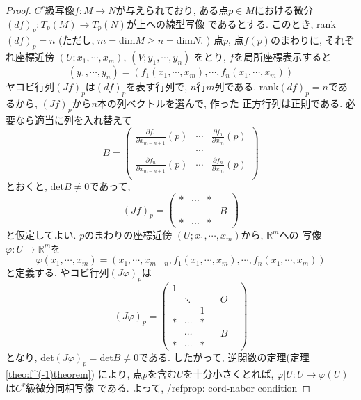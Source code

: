 \documentclass[a4j,12pt]{jarticle}
\theoremstyle{definition}
\begin{document}
\begin{proof}
    $C^r$級写像$f:M\to N$が与えられており, 
    ある点$p\in M$における微分
    $(df)_p:T_p(M)\to T_p(N)$が上への線型写像
    であるとする. このとき, rank$(df)_p=n$
    (ただし, $m=$dim$M\geq n=$dim$N$. )
    点$p$, 点$f(p)$のまわりに, それぞれ座標近傍
    $(U;x_1,\cdots ,x_m)$, $(V;y_1,\cdots ,y_n)$
    をとり, $f$を局所座標表示すると
    $$(y_1, \cdots ,y_n)=(f_1(x_1,\cdots ,x_m), 
    \cdots ,f_n(x_1,\cdots ,x_m))$$
    ヤコビ行列$(Jf)_p$は$(df)_p$を表す行列で, 
    $n$行$m$列である. rank$(df)_p=n$であるから, 
    $(Jf)_p$から$n$本の列ベクトルを選んで, 作った
    正方行列は正則である. 必要なら適当に列を入れ替えて
    $$B=
    \begin{pmatrix}
        \frac{\partial f_1}{\partial x_{m-n+1}}(p) & \cdots & \frac{\partial f_1}{\partial x_m}(p)  \\
        &\cdots& \\
        \frac{\partial f_n}{\partial x_{m-n+1}}(p) & \cdots & \frac{\partial f_n}{\partial x_m}(p)  \\
    \end{pmatrix}
    $$
    とおくと, det$B \neq 0$であって, 
    $$(Jf)_p=
    \left(
        \begin{array}{ccc|c} 
          * & \cdots & *  &  \\
           &  &   & B \\
          * & \cdots & *  & 
        \end{array} 
        \right)
$$
と仮定してよい. $p$のまわりの座標近傍
$(U;x_1,\cdots ,x_m)$から, $\mathbb{R}^m$への
写像$\varphi :U\to \mathbb{R}^m$を
$$\varphi(x_1,\cdots ,x_m)=(x_1, \cdots ,x_{m-n},f_1(x_1,\cdots ,x_m), 
\cdots ,f_n(x_1,\cdots ,x_m))$$
と定義する. やコビ行列$(J\varphi)_p$は
$$(J\varphi)_p=
    \left(
        \begin{array}{ccc|ccc} 
          1 &        &   & & & \\
            & \ddots &   & &O& \\
            &        & 1 & & &  \\ \hline
          * & \cdots & * & & &  \\
            & \cdots &   & &B& \\
          * & \cdots & * & & &
        \end{array} 
        \right)
$$
となり, det$(J\varphi)_p=$det$B\neq 0$である. 
したがって, 逆関数の定理(定理
\ref{theo:f^(-1)theorem})
により, 点$p$を含む$U$を十分小さくとれば, 
$\varphi |U:U\to \varphi(U)$は$C^r$級微分同相写像
である. よって, /ref{prop: cord-nabor condition}

\end{proof}
\end{document}
